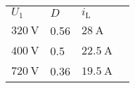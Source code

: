 \begin{table}[ht]
    \centering  %
    \begin{tabular}{llll}
        \toprule
        
        $U_\mathrm{1}$ & $D$ & $i_\mathrm{L}$ \\ 
        $\SI{320}{\volt}$ & 0.56 & $\SI{28}{\ampere}$ \\ 
        $\SI{400}{\volt}$ & 0.5 & $\SI{22.5}{\ampere}$ \\ 
        $\SI{720}{\volt}$ & 0.36 & $\SI{19.5}{\ampere}$ \\ 
        \bottomrule
    \end{tabular}
\end{table}